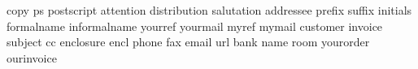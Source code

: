               {copy}
                {ps}
        {postscript}
         {attention}
      {distribution}
        {salutation}
         {addressee}
            {prefix}
            {suffix}
          {initials}
        {formalname}
      {informalname}
           {yourref}
          {yourmail}
             {myref}
            {mymail}
          {customer}
           {invoice}
           {subject}
                {cc}
         {enclosure}
              {encl}
             {phone}
               {fax}
             {email}
               {url}
              {bank}
              {name}
              {room}
         {yourorder}
        {ourinvoice}
\stopinterface

